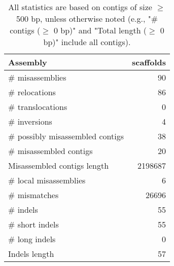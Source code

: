 \documentclass[12pt,a4paper]{article}
\begin{document}
\begin{table}[ht]
\begin{center}
\caption{All statistics are based on contigs of size $\geq$ 500 bp, unless otherwise noted (e.g., "\# contigs ($\geq$ 0 bp)" and "Total length ($\geq$ 0 bp)" include all contigs).}
\begin{tabular}{|l*{1}{|r}|}
\hline
Assembly & scaffolds \\ \hline
\# misassemblies & 90 \\ \hline
\hspace{5mm}\# relocations & 86 \\ \hline
\hspace{5mm}\# translocations & 0 \\ \hline
\hspace{5mm}\# inversions & 4 \\ \hline
\# possibly misassembled contigs & 38 \\ \hline
\# misassembled contigs & 20 \\ \hline
Misassembled contigs length & 2198687 \\ \hline
\# local misassemblies & 6 \\ \hline
\# mismatches & 26696 \\ \hline
\# indels & 55 \\ \hline
\hspace{5mm}\# short indels & 55 \\ \hline
\hspace{5mm}\# long indels & 0 \\ \hline
Indels length & 57 \\ \hline
\end{tabular}
\end{center}
\end{table}
\end{document}
